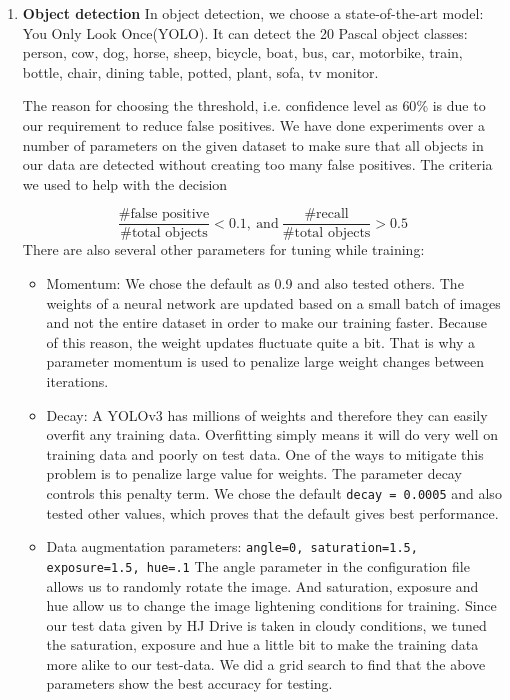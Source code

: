 \begin{enumerate}
    \item \textbf{Object detection} In object detection, we choose a state-of-the-art model: You Only Look Once(YOLO)\cite{Redmon2018YOLOv3}. It can detect the 20 Pascal object classes: person, cow, dog, horse, sheep, bicycle, boat, bus, car, motorbike, train, bottle, chair, dining table, potted, plant, sofa, tv monitor. 
    



The reason for choosing the threshold, i.e. confidence level as $60\%$ is due to our requirement to reduce false positives. We have done experiments over a number of parameters on the given dataset to make sure that all objects in our data are detected without creating too many false positives. The criteria we used to help with the decision

$$
\frac{\#\text{false positive}}{\#\text{total objects}} < 0.1,\ \text{and} \ \frac{\#\text{recall}}{\#\text{total objects}}> 0.5
$$
There are also several other parameters for tuning while training: 

\begin{itemize}
    \item Momentum: We chose the default as 0.9 and also tested others. The weights of a neural network are updated based on a small batch of images and not the entire dataset in order to make our training faster. Because of this reason, the weight updates fluctuate quite a bit. That is why a parameter momentum is used to penalize large weight changes between iterations. 
    
    \item Decay: A YOLOv3 has millions of weights and therefore they can easily overfit any training data. Overfitting simply means it will do very well on training data and poorly on test data. One of the ways to mitigate this problem is to penalize large value for weights. The parameter decay controls this penalty term. We chose the default \texttt{decay = 0.0005} and also tested other values, which proves that the default gives best performance. 
    \item Data augmentation parameters: \texttt{angle=0, saturation=1.5, exposure=1.5, hue=.1} The angle parameter in the configuration file allows us to randomly rotate the image. And saturation, exposure and hue allow us to change the image lightening conditions for training. Since our test data given by HJ Drive is taken in cloudy conditions, we tuned the saturation, exposure and hue a little bit to make the training data more alike to our test-data. We did a grid search to find that the above parameters show the best accuracy for testing.  
\end{itemize}


\end{enumerate}





